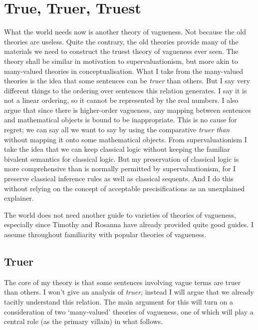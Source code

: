 %
%
%
%
%
%
%
%
%
%
\chapter{True, Truer, Truest}


What the world needs now is another theory of vagueness. Not because the old theories are useless. Quite the contrary, the old theories provide many of the materials we need to construct the truest theory of vagueness ever seen.  The theory shall be similar in motivation to supervaluationism, but more akin to many-valued theories in conceptualisation. What I take from the many-valued theories is the idea that some sentences can be \textit{truer} than others. But I say very different things to the ordering over sentences this relation generates. I say it is not a linear ordering, so it cannot be represented by the real numbers. I also argue that since there is higher-order vagueness, any mapping between sentences and mathematical objects is bound to be inappropriate. This is no cause for regret; we can say all we want to say by using the comparative \textit{truer than} without mapping it onto some mathematical objects. From supervaluationism I take the idea that we can keep classical logic without keeping the familiar bivalent semantics for classical logic. But my preservation of classical logic is more comprehensive than is normally permitted by supervaluationism, for I preserve classical inference rules as well as classical sequents. And I do this without relying on the concept of acceptable precisifications as an unexplained explainer. 

The world does not need another guide to varieties of theories of vagueness, especially since Timothy \citet{Williamson1994-WILV} and Rosanna \citet{Keefe2000} have already provided quite good guides. I assume throughout familiarity with popular theories of vagueness.

\section{Truer}
The core of my theory is that some sentences involving vague terms are truer than others. I won't give an analysis of \textit{truer}, instead I will argue that we already tacitly understand this relation. The main argument for this will turn on a consideration of two `many-valued' theories of vagueness, one of which will play a central role (as the primary villain) in what follows.

